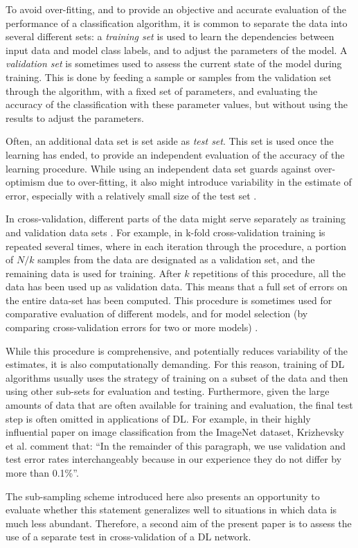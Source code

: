 To avoid over-fitting, and to provide an objective and accurate evaluation of
the performance of a classification algorithm, it is common to separate the data
into several different sets: a \emph{training set} is used to learn the
dependencies between input data and model class labels, and to adjust the
parameters of the model. A \emph{validation set} is sometimes used to assess the
current state of the model during training. This is done by feeding a sample or
samples from the validation set through the algorithm, with a fixed set of
parameters, and evaluating the accuracy of the classification with these
parameter values, but without using the results to adjust the parameters.

Often, an additional data set is set aside as \emph{test set}. This set is used
once the learning has ended, to provide an independent evaluation of the 
accuracy of the learning procedure. While using an independent data set guards 
against over-optimism due to over-fitting, it also might introduce 
variability in the estimate of error, especially with a relatively small size 
of the test set \citep{Efron1983-vu}.

In cross-validation, different parts of the data might serve separately as
training and validation data sets \citep{Stone1974-mo}. For example, in k-fold
cross-validation training is repeated several times, where in each iteration
through the procedure, a portion of $N/k$ samples from the data are designated
as a validation set, and the remaining data is used for training. After $k$
repetitions of this procedure, all the data has been used up as validation data.
This means that a full set of errors on the entire data-set has been computed.
This procedure is sometimes used for comparative evaluation of different models,
and for model selection (by comparing cross-validation errors for two or more
models) \citep{Stone1977-ez}.

While this procedure is comprehensive, and potentially reduces variability of
the estimates, it is also computationally demanding. For this reason, training
of DL algorithms usually uses the strategy of training on a subset of the data
and then using other sub-sets for evaluation and testing.  Furthermore, given
the large amounts of data that are often available for training and evaluation,
the final test step is often omitted in applications of DL. For example, in
their highly influential paper on image classification from the ImageNet
dataset, Krizhevsky et al. \citep{Krizhevsky2012-qc} comment that: ``In the
remainder of this paragraph, we use validation and test error rates
interchangeably because in our experience they do not differ by more than
0.1\%''.

The sub-sampling scheme introduced here also presents an opportunity to evaluate
whether this statement generalizes well to situations in which data is much less
abundant. Therefore, a second aim of the present paper is to assess the use of a
separate test in cross-validation of a DL network.
